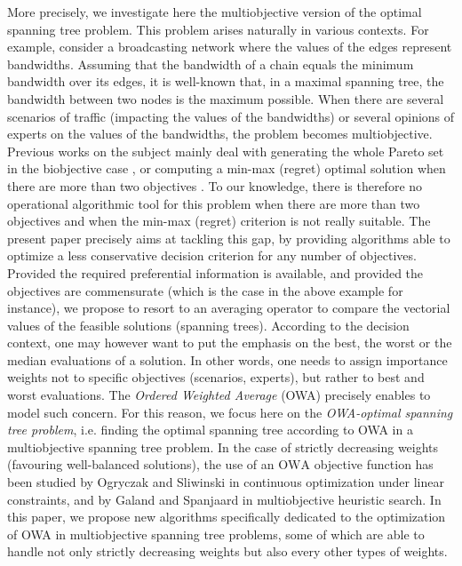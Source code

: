 \documentclass[final,3p,times]{elsarticle}
\newcommand{\owa}{\mbox{OWA}}
\begin{document}
More precisely, we investigate here the multiobjective version of the
optimal spanning tree problem. This problem arises naturally in
various contexts. For example, consider a broadcasting network where
the values of the edges represent bandwidths. Assuming that the
bandwidth of a chain equals the minimum bandwidth over its edges, it
is well-known that, in a maximal spanning tree, the bandwidth between
two nodes is the maximum possible. When there are several scenarios of
traffic (impacting the values of the bandwidths) or several opinions
of experts on the values of the bandwidths, the problem becomes
multiobjective. Previous works on the subject mainly deal with generating the whole Pareto set in the biobjective case \cite{AndJL96,HamaR94,SourS08,SteiR08}, or computing a min-max (regret) optimal solution when there are more than two objectives \cite{AisBV09,HamaR94,KouvY97,Warbu85,Yu98}. To our knowledge, there is therefore no operational algorithmic tool for this problem when there are more than two objectives and when the min-max (regret) criterion is not really suitable. The present paper precisely aims at tackling this gap, by providing algorithms able to optimize a less conservative decision criterion for any number of objectives. Provided the required preferential information is available, and provided the objectives are commensurate (which is the case in the above example for instance), we propose to resort to an averaging operator to compare
the vectorial values of the feasible solutions (spanning trees). According to the decision context, one may however want to put the emphasis on the best, the worst or the median evaluations of a solution. In other words, one needs to assign
importance weights not to specific objectives (scenarios, experts), but rather to
best and worst evaluations. The \emph{Ordered Weighted Average} (OWA)
precisely enables to model such concern. For this reason, we focus
here on the \emph{OWA-optimal spanning tree problem}, i.e. finding the
optimal spanning tree according to OWA in a multiobjective spanning
tree problem. 
In the case of strictly decreasing weights (favouring well-balanced
solutions), the use of an $\owa$ objective function has been studied
by Ogryczak and Sliwinski \cite{Ogryc09,OgryS03} in continuous
optimization under linear constraints, and by Galand and Spanjaard \cite{GalaS07b} in multiobjective heuristic search. In this paper, we propose new algorithms specifically dedicated to the optimization of OWA in multiobjective spanning tree problems, some of which are able to handle not only strictly decreasing weights but also every other types of weights.
\end{document}

